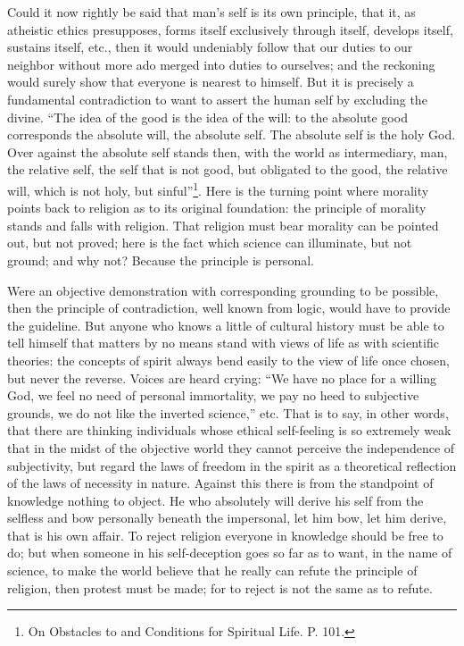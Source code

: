 \documentclass[12pt,a4paper,openany]{book}
\newcommand{\opage}[1]{\marginnote{\footnotesize\textit{[#1]}}}
\begin{document}
Could it now rightly be said that man's self
is its own principle, that it, as atheistic ethics
presupposes, forms itself exclusively through itself, develops
itself, sustains itself, etc., then it would undeniably
follow that our duties to our neighbor
without more ado merged into duties to ourselves; and the reckoning
would surely show that everyone is nearest to himself. But
it is precisely a fundamental contradiction to want to assert the
human self by excluding the divine.
``The idea of the good is the idea of the will: to the absolute
good corresponds the absolute will, the absolute self.
The absolute self is the holy God. Over against
the absolute self stands then, with the world as intermediary,
man, the relative self, the self that
is not good, but obligated to the good, the relative
will, which is not holy, but sinful''\footnote[1]{On Obstacles to and Conditions for Spiritual Life. P. 101.}. Here
is the turning point where morality points back to
religion as to its original foundation: the principle of morality
stands and falls with religion. That religion
must bear morality can be pointed out, but
not proved; here is the fact which
\setcounter{footnote}{0}%
\opage{602}science can illuminate, but not ground; and why not?
Because the principle is personal.

Were an objective demonstration with corresponding
grounding to be possible, then the principle of contradiction,
well known from logic, would have to provide the guideline.
But anyone who knows a little of cultural history
must be able to tell himself that matters by no means stand
with views of life as with scientific theories:
the concepts of spirit always bend easily to the view of life
once chosen, but never the reverse. Voices are heard
crying: ``We have no place for a willing
God, we feel no need of personal immortality, we
pay no heed to subjective grounds, we do not like the inverted
science,'' etc. That is to say, in other words,
that there are thinking individuals whose ethical self-feeling
is so extremely weak that in the midst of the objective world
they cannot perceive the independence of subjectivity, but
regard the laws of freedom in the spirit as a theoretical reflection
of the laws of necessity in nature. Against this
there is from the standpoint of knowledge nothing to object. He who
absolutely will derive his self from the selfless and bow
personally beneath the impersonal, let him bow,
let him derive, that is his own affair. To reject
religion everyone in knowledge should be free to do; but
when someone in his self-deception goes so far as to want, in the
name of science, to make the world believe that he really
can refute the principle of religion, then protest
must be made; for to reject is not the same as to
refute.
\end{document}
